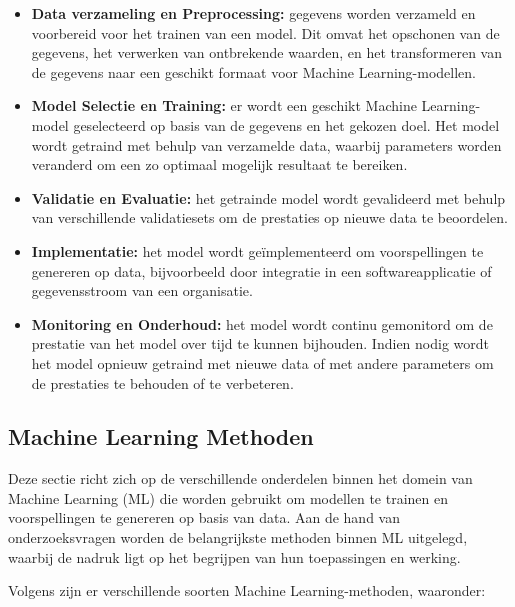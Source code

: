 \begin{itemize}
    \item \textbf{Data verzameling en Preprocessing:} gegevens worden verzameld en voorbereid voor het trainen van een model. Dit omvat het opschonen van de gegevens, het verwerken van ontbrekende waarden, en het transformeren van de gegevens naar een geschikt formaat voor Machine Learning-modellen.

    \item \textbf{Model Selectie en Training:} er wordt een geschikt Machine Learning-model geselecteerd op basis van de gegevens en het gekozen doel. Het model wordt getraind met behulp van verzamelde data, waarbij parameters worden veranderd om een zo optimaal mogelijk resultaat te bereiken.
    
    \item \textbf{Validatie en Evaluatie:} het getrainde model wordt gevalideerd met behulp van verschillende validatiesets om de prestaties op nieuwe data te beoordelen.
    
    \item \textbf{Implementatie:} het model wordt geïmplementeerd om voorspellingen te genereren op data, bijvoorbeeld door integratie in een softwareapplicatie of gegevensstroom van een organisatie.

    \item \textbf{Monitoring en Onderhoud:} het model wordt continu gemonitord om de prestatie van het model over tijd te kunnen bijhouden. Indien nodig wordt het model opnieuw getraind met nieuwe data of met andere parameters om de prestaties te behouden of te verbeteren.
\end{itemize}

\subsection{Machine Learning Methoden}

Deze sectie richt zich op de verschillende onderdelen binnen het domein van Machine Learning (ML) die worden gebruikt om modellen te trainen en voorspellingen te genereren op basis van data. Aan de hand van onderzoeksvragen worden de belangrijkste methoden binnen ML uitgelegd, waarbij de nadruk ligt op het begrijpen van hun toepassingen en werking.


Volgens \textcite{Mahesh2019} zijn er verschillende soorten Machine Learning-methoden, waaronder:


